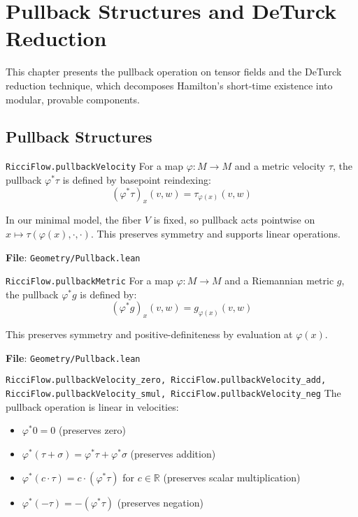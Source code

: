 \chapter{Pullback Structures and DeTurck Reduction}
\label{chap:deturck}

\providecommand{\lean}[1]{\texttt{#1}}

This chapter presents the pullback operation on tensor fields and the DeTurck reduction technique, which decomposes Hamilton's short-time existence into modular, provable components.

\section{Pullback Structures}

\begin{definition}
\label{def:pullback_velocity}
\lean{RicciFlow.pullbackVelocity}
\leanok
{}
For a map $\varphi : M \to M$ and a metric velocity $\tau$, the pullback $\varphi^*\tau$ is defined by basepoint reindexing:
\[ (\varphi^*\tau)_x(v,w) = \tau_{\varphi(x)}(v,w) \]

In our minimal model, the fiber $V$ is fixed, so pullback acts pointwise on $x \mapsto \tau(\varphi(x), \cdot, \cdot)$. This preserves symmetry and supports linear operations.

\textbf{File}: \texttt{Geometry/Pullback.lean}
\end{definition}

\begin{definition}
\label{def:pullback_metric}
\lean{RicciFlow.pullbackMetric}
\leanok
{}
For a map $\varphi : M \to M$ and a Riemannian metric $g$, the pullback $\varphi^*g$ is defined by:
\[ (\varphi^*g)_x(v,w) = g_{\varphi(x)}(v,w) \]

This preserves symmetry and positive-definiteness by evaluation at $\varphi(x)$.

\textbf{File}: \texttt{Geometry/Pullback.lean}
\end{definition}

\begin{lemma}
\label{lem:pullback_linearity}
\lean{RicciFlow.pullbackVelocity_zero, RicciFlow.pullbackVelocity_add, RicciFlow.pullbackVelocity_smul, RicciFlow.pullbackVelocity_neg}
\leanok
{}
The pullback operation is linear in velocities:
\begin{itemize}
\item $\varphi^*0 = 0$ (preserves zero)
\item $\varphi^*(\tau + \sigma) = \varphi^*\tau + \varphi^*\sigma$ (preserves addition)
\item $\varphi^*(c \cdot \tau) = c \cdot (\varphi^*\tau)$ for $c \in \mathbb{R}$ (preserves scalar multiplication)
\item $\varphi^*(-\tau) = -(\varphi^*\tau)$ (preserves negation)
\end{itemize}
\end{lemma}

